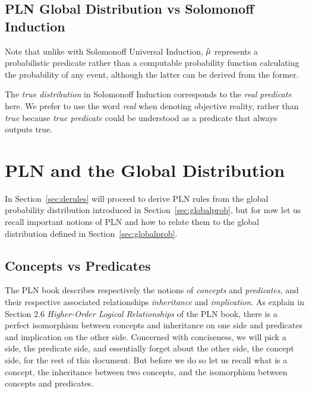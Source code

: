 \documentclass[]{article}
\begin{document}
\subsection{PLN Global Distribution vs Solomonoff Induction}
Note that unlike with Solomonoff Universal Induction, $\hat{\mu}$
represents a probabilistic predicate rather than a computable
probability function calculating the probability of any event,
although the latter can be derived from the former.

The \emph{true distribution} in Solomonoff Induction corresponds to
the \emph{real predicate} here.  We prefer to use the word \emph{real}
when denoting objective reality, rather than \emph{true} because
\emph{true predicate} could be understood as a predicate that always
outputs true.

\section{PLN and the Global Distribution}
In Section~\ref{sec:derules} will proceed to derive PLN rules from the
global probability distribution introduced in
Section~\ref{sec:globalprob}, but for now let us recall important
notions of PLN and how to relate them to the global distribution
defined in Section~\ref{sec:globalprob}.

\subsection{Concepts vs Predicates}
The PLN book describes respectively the notions of \emph{concepts} and
\emph{predicates}, and their respective associated relationships
\emph{inheritance} and \emph{implication}.  As explain in Section 2.6
\emph{Higher-Order Logical Relationships} of the PLN book, there is a
perfect isomorphism between concepts and inheritance on one side and
predicates and implication on the other side.  Concerned with
conciseness, we will pick a side, the predicate side, and essentially
forget about the other side, the concept side, for the rest of this
document.  But before we do so let us recall what is a concept, the
inheritance between two concepts, and the isomorphism between concepts
and predicates.
\end{document}
